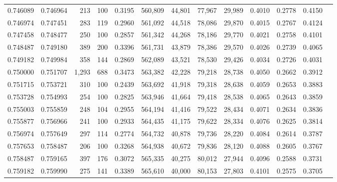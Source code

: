 \begin{tabular}{rrrrrrrrrrrrr}
0.746089 & 0.746964 &   213 & 100 &                                     0.3195 & 560,809 &  44,801 &  77,967 &  29,989 & 0.4010 & 0.2778 & 0.4150 \\
0.746974 & 0.747451 &   283 & 119 &                                     0.2960 & 561,092 &  44,518 &  78,086 &  29,870 & 0.4015 & 0.2767 & 0.4124 \\
0.747458 & 0.748477 &   250 & 100 &                                     0.2857 & 561,342 &  44,268 &  78,186 &  29,770 & 0.4021 & 0.2758 & 0.4101 \\
0.748487 & 0.749180 &   389 & 200 &                                     0.3396 & 561,731 &  43,879 &  78,386 &  29,570 & 0.4026 & 0.2739 & 0.4065 \\
0.749182 & 0.749984 &   358 & 144 &                                     0.2869 & 562,089 &  43,521 &  78,530 &  29,426 & 0.4034 & 0.2726 & 0.4031 \\
0.750000 & 0.751707 & 1,293 & 688 &                                     0.3473 & 563,382 &  42,228 &  79,218 &  28,738 & 0.4050 & 0.2662 & 0.3912 \\
0.751715 & 0.753721 &   310 & 100 &                                     0.2439 & 563,692 &  41,918 &  79,318 &  28,638 & 0.4059 & 0.2653 & 0.3883 \\
0.753728 & 0.754993 &   254 & 100 &                                     0.2825 & 563,946 &  41,664 &  79,418 &  28,538 & 0.4065 & 0.2643 & 0.3859 \\
0.755003 & 0.755859 &   248 & 104 &                                     0.2955 & 564,194 &  41,416 &  79,522 &  28,434 & 0.4071 & 0.2634 & 0.3836 \\
0.755877 & 0.756966 &   241 & 100 &                                     0.2933 & 564,435 &  41,175 &  79,622 &  28,334 & 0.4076 & 0.2625 & 0.3814 \\
0.756974 & 0.757649 &   297 & 114 &                                     0.2774 & 564,732 &  40,878 &  79,736 &  28,220 & 0.4084 & 0.2614 & 0.3787 \\
0.757653 & 0.758487 &   206 & 100 &                                     0.3268 & 564,938 &  40,672 &  79,836 &  28,120 & 0.4088 & 0.2605 & 0.3767 \\
0.758487 & 0.759165 &   397 & 176 &                                     0.3072 & 565,335 &  40,275 &  80,012 &  27,944 & 0.4096 & 0.2588 & 0.3731 \\
0.759182 & 0.759990 &   275 & 141 &                                     0.3389 & 565,610 &  40,000 &  80,153 &  27,803 & 0.4101 & 0.2575 & 0.3705 \\

\end{tabular}
